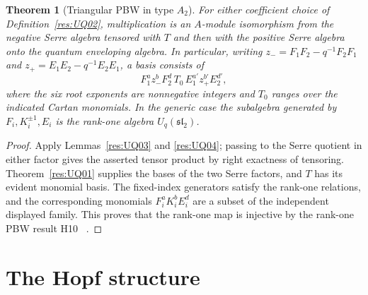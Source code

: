 \documentclass[11pt,oneside,openany]{book}
\newtheorem{theorem}{Theorem}[chapter]
\theoremstyle{definition}
\theoremstyle{remark}
\begin{document}
\begin{theorem}[Triangular PBW in type \(A_2\)]
\label{res:UQ05}
For either coefficient choice of Definition~\ref{res:UQ02},
multiplication is an \(A\)-module isomorphism from
the negative Serre algebra tensored with \(T\) and then
with the positive Serre algebra onto the quantum
enveloping algebra. In particular, writing
\(z_-=F_1F_2-q^{-1}F_2F_1\) and
\(z_+=E_1E_2-q^{-1}E_2E_1\), a basis consists of
\[
 F_1^a z_-^b F_2^d\, T_0\, E_1^{a'} z_+^{b'} E_2^{d'},
\]
where the six root exponents are nonnegative integers and
\(T_0\) ranges over the indicated Cartan monomials.
In the generic case the subalgebra generated by
\(F_i,K_i^{\pm1},E_i\) is the rank-one algebra
\(U_q(\mathfrak{sl}_2)\).
\end{theorem}
\begin{proof}
Apply Lemmas~\ref{res:UQ03} and \ref{res:UQ04};
passing to the Serre quotient in either factor gives
the asserted tensor product by right exactness of
tensoring. Theorem~\ref{res:UQ01} supplies the bases
of the two Serre factors, and \(T\) has its evident
monomial basis. The fixed-index generators satisfy the
rank-one relations, and the corresponding monomials
\(F_i^aK_i^bE_i^d\) are a subset of the independent
displayed family. This proves that the rank-one map is
injective by the rank-one PBW result H10
~\cite[PDF p.~25]{mg-rm03d}.
\end{proof}

\section{The Hopf structure}
\end{document}
